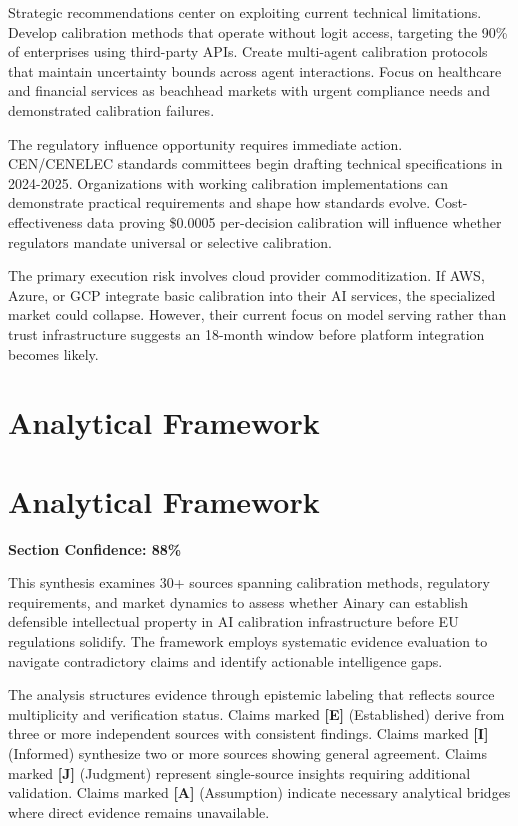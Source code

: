 \documentclass[a4paper,11pt]{article}
\newcommand{\elabel}{\textbf{\textcolor{ecolor}{[E]}}}
\newcommand{\ilabel}{\textbf{\textcolor{icolor}{[I]}}}
\newcommand{\jlabel}{\textbf{\textcolor{jcolor}{[J]}}}
\newcommand{\alabel}{\textbf{\textcolor{acolor}{[A]}}}
\begin{document}
Strategic recommendations center on exploiting current technical limitations. Develop calibration methods that operate without logit access, targeting the 90\% of enterprises using third-party APIs. Create multi-agent calibration protocols that maintain uncertainty bounds across agent interactions. Focus on healthcare and financial services as beachhead markets with urgent compliance needs and demonstrated calibration failures.


The regulatory influence opportunity requires immediate action. CEN/CENELEC standards committees begin drafting technical specifications in 2024-2025. Organizations with working calibration implementations can demonstrate practical requirements and shape how standards evolve. Cost-effectiveness data proving \$0.0005 per-decision calibration will influence whether regulators mandate universal or selective calibration.


The primary execution risk involves cloud provider commoditization. If AWS, Azure, or GCP integrate basic calibration into their AI services, the specialized market could collapse. However, their current focus on model serving rather than trust infrastructure suggests an 18-month window before platform integration becomes likely.

\clearpage
\section{Analytical Framework}

\section{Analytical Framework}

\textbf{Section Confidence: 88\%}\par

This synthesis examines 30+ sources spanning calibration methods, regulatory requirements, and market dynamics to assess whether Ainary can establish defensible intellectual property in AI calibration infrastructure before EU regulations solidify. The framework employs systematic evidence evaluation to navigate contradictory claims and identify actionable intelligence gaps.


The analysis structures evidence through epistemic labeling that reflects source multiplicity and verification status. Claims marked \elabel{} (Established) derive from three or more independent sources with consistent findings. Claims marked \ilabel{} (Informed) synthesize two or more sources showing general agreement. Claims marked \jlabel{} (Judgment) represent single-source insights requiring additional validation. Claims marked \alabel{} (Assumption) indicate necessary analytical bridges where direct evidence remains unavailable.
\end{document}
